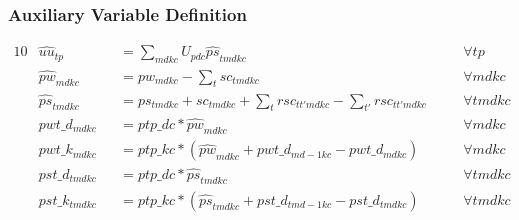 \subsubsection{Auxiliary Variable Definition}
\label{auxiliary constraints}
\begin{alignat}{10}
	& \hat{uu}_{tp} 
		&& =  \sum_{mdkc} U_{pdc} \hat{ps}_{tmdkc} \quad
		&& \forall tp \\ 
	& \hat{pw}_{mdkc} 
		&& = pw_{mdkc} - \sum_{t} sc_{tmdkc} \quad 
		&& \forall mdkc \\ 
	& \hat{ps}_{tmdkc} 
		&& = ps_{tmdkc} + sc_{tmdkc} + 
		\sum_{t} rsc_{tt'mdkc} - \sum_{t'} rsc_{tt'mdkc} \quad 
		&& \forall tmdkc \\
	& pwt\_d_{mdkc} 
		&& = ptp\_{dc} * \hat{pw}_{mdkc} \quad
		&& \forall mdkc \\
	& pwt\_k_{mdkc} 
		&& = ptp\_{kc} * ( \hat{pw}_{mdkc} + pwt\_d_{md-1kc} - pwt\_d_{mdkc} )  \quad
		&& \forall mdkc \\
	& pst\_d_{tmdkc} 
		&& = ptp\_{dc} * \hat{ps}_{tmdkc} \quad
		&& \forall tmdkc \\
	& pst\_k_{tmdkc} 
		&& = ptp\_{kc} * ( \hat{ps}_{tmdkc} + pst\_d_{tmd-1kc} - pst\_d_{tmdkc} )  \quad
		&& \forall tmdkc
\end{alignat}

